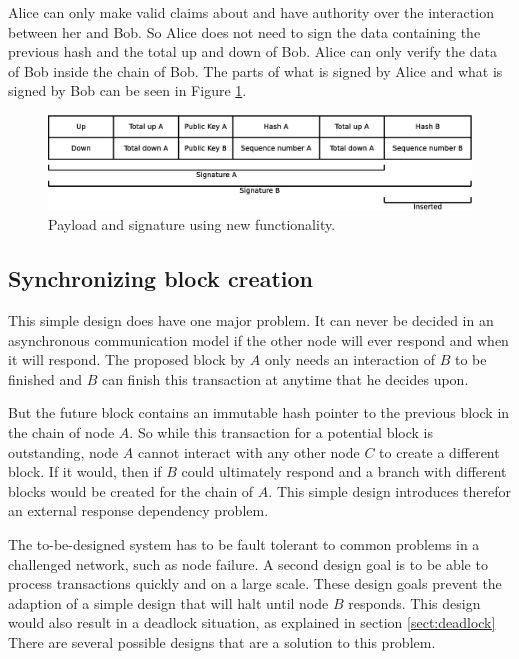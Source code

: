 Alice can only make valid claims about and have authority over the interaction between her and Bob.
So Alice does not need to sign the data containing the previous hash and the total up and down of Bob.
Alice can only verify the data of Bob inside the chain of Bob.
The parts of what is signed by Alice and what is signed by Bob can be seen in Figure \ref{fig:payload-signature-new}.

\begin{figure}
	\centerline{\includegraphics[scale=0.3]{design/figs/signature_new.eps}}
	\caption{Payload and signature using new functionality.}
	\label{fig:payload-signature-new}
\end{figure}


\subsection{Synchronizing block creation}
This simple design does have one major problem.
It can never be decided in an asynchronous communication model
if the other node will ever respond and when it will respond.
The proposed block by $A$ only needs an interaction of $B$ to be finished
and $B$ can finish this transaction at anytime that he decides upon.

But the future block contains an immutable hash pointer
to the previous block in the chain of node $A$.
So while this transaction for a potential block is outstanding,
node $A$ cannot interact with any other node $C$ to create a different block.
If it would, then if $B$ could ultimately respond and a branch with different blocks
would be created for the chain of $A$.
This simple design introduces therefor an external response dependency problem.

The to-be-designed system has to be fault tolerant to 
common problems in a challenged network, such as node failure.
A second design goal is to be able to process transactions quickly and on a large scale.
These design goals prevent the adaption of a simple design that will halt until node $B$ responds.
This design would also result in a deadlock situation, as explained in section \ref{sect:deadlock}
There are several possible designs that are a solution to this problem.

